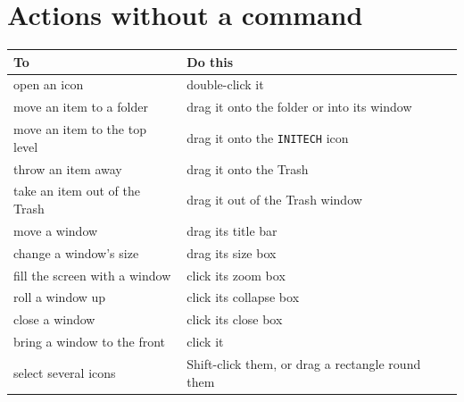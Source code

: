 \section{Actions without a command}
\begin{center}\small
\begin{tabular}{@{}p{40mm}p{59mm}@{}}
\textbf{To} & \textbf{Do this}\\\hline
open an icon & double-click it\\
move an item to a folder & drag it onto the folder or into its window\\
move an item to the top level & drag it onto the \texttt{INITECH} icon\\
throw an item away & drag it onto the Trash\\
take an item out of the Trash & drag it out of the Trash window\\
move a window & drag its title bar\\
change a window's size & drag its size box\\
fill the screen with a window & click its zoom box\\
roll a window up & click its collapse box\\
close a window & click its close box\\
bring a window to the front & click it\\
select several icons & Shift-click them, or drag a rectangle round them\\
\end{tabular}
\end{center}
